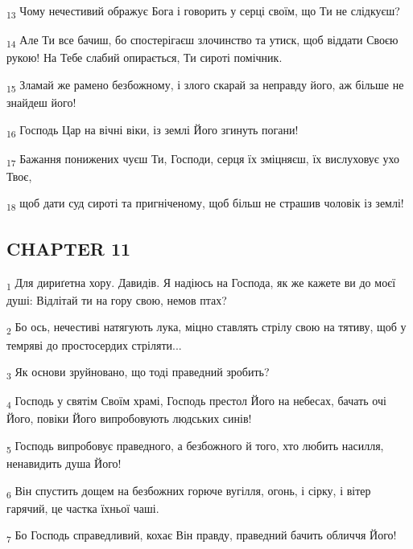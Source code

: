 \begin{tcolorbox}
\textsubscript{13} Чому нечестивий ображує Бога і говорить у серці своїм, що Ти не слідкуєш?
\end{tcolorbox}
\begin{tcolorbox}
\textsubscript{14} Але Ти все бачиш, бо спостерігаєш злочинство та утиск, щоб віддати Своєю рукою! На Тебе слабий опирається, Ти сироті помічник.
\end{tcolorbox}
\begin{tcolorbox}
\textsubscript{15} Зламай же рамено безбожному, і злого скарай за неправду його, аж більше не знайдеш його!
\end{tcolorbox}
\begin{tcolorbox}
\textsubscript{16} Господь Цар на вічні віки, із землі Його згинуть погани!
\end{tcolorbox}
\begin{tcolorbox}
\textsubscript{17} Бажання понижених чуєш Ти, Господи, серця їх зміцняєш, їх вислуховує ухо Твоє,
\end{tcolorbox}
\begin{tcolorbox}
\textsubscript{18} щоб дати суд сироті та пригніченому, щоб більш не страшив чоловік із землі!
\end{tcolorbox}
\subsection{CHAPTER 11}
\begin{tcolorbox}
\textsubscript{1} Для дириґетна хору. Давидів. Я надіюсь на Господа, як же кажете ви до моєї душі: Відлітай ти на гору свою, немов птах?
\end{tcolorbox}
\begin{tcolorbox}
\textsubscript{2} Бо ось, нечестиві натягують лука, міцно ставлять стрілу свою на тятиву, щоб у темряві до простосердих стріляти...
\end{tcolorbox}
\begin{tcolorbox}
\textsubscript{3} Як основи зруйновано, що тоді праведний зробить?
\end{tcolorbox}
\begin{tcolorbox}
\textsubscript{4} Господь у святім Своїм храмі, Господь престол Його на небесах, бачать очі Його, повіки Його випробовують людських синів!
\end{tcolorbox}
\begin{tcolorbox}
\textsubscript{5} Господь випробовує праведного, а безбожного й того, хто любить насилля, ненавидить душа Його!
\end{tcolorbox}
\begin{tcolorbox}
\textsubscript{6} Він спустить дощем на безбожних горюче вугілля, огонь, і сірку, і вітер гарячий, це частка їхньої чаші.
\end{tcolorbox}
\begin{tcolorbox}
\textsubscript{7} Бо Господь справедливий, кохає Він правду, праведний бачить обличчя Його!
\end{tcolorbox}
